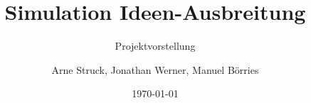 \documentclass{beamer}
\title{Simulation Ideen-Ausbreitung}
\subtitle{Projektvorstellung}
\author{Arne Struck, Jonathan Werner, Manuel Börries}
\institute{Universität Hamburg, Fachschaft Informatik, Praktikum paralleles Programmieren}
\date{\today}
\begin{document}
\begin{frame}[plain]
	\titlepage
\end{frame}
	
\begin{frame}
	\tableofcontents
\end{frame}






	
\end{document}
